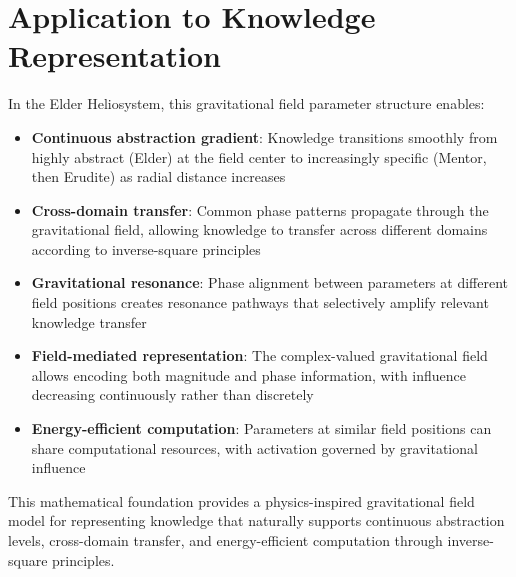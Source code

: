 \section{Application to Knowledge Representation}

In the Elder Heliosystem, this gravitational field parameter structure enables:

\begin{itemize}
    \item \textbf{Continuous abstraction gradient}: Knowledge transitions smoothly from highly abstract (Elder) at the field center to increasingly specific (Mentor, then Erudite) as radial distance increases
    
    \item \textbf{Cross-domain transfer}: Common phase patterns propagate through the gravitational field, allowing knowledge to transfer across different domains according to inverse-square principles
    
    \item \textbf{Gravitational resonance}: Phase alignment between parameters at different field positions creates resonance pathways that selectively amplify relevant knowledge transfer
    
    \item \textbf{Field-mediated representation}: The complex-valued gravitational field allows encoding both magnitude and phase information, with influence decreasing continuously rather than discretely
    
    \item \textbf{Energy-efficient computation}: Parameters at similar field positions can share computational resources, with activation governed by gravitational influence
\end{itemize}

This mathematical foundation provides a physics-inspired gravitational field model for representing knowledge that naturally supports continuous abstraction levels, cross-domain transfer, and energy-efficient computation through inverse-square principles.